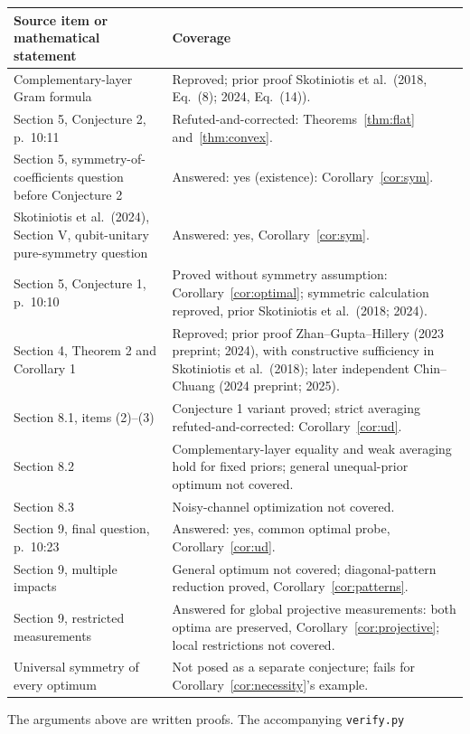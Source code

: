 \documentclass[11pt]{article}
\begin{document}
\begin{center}\small
\begin{tabular}{@{}p{.40\linewidth}p{.53\linewidth}@{}}
\toprule
Source item or mathematical statement&Coverage\\\midrule
Complementary-layer Gram formula&Reproved; prior proof Skotiniotis
et al.\ (2018, Eq.~(8); 2024, Eq.~(14)).\\
Section 5, Conjecture 2, p.~10:11&Refuted-and-corrected:
Theorems~\ref{thm:flat} and~\ref{thm:convex}.\\
Section 5, symmetry-of-coefficients question before Conjecture 2&Answered: yes
(existence):
Corollary~\ref{cor:sym}.\\
Skotiniotis et al.\ (2024), Section V, qubit-unitary pure-symmetry question&Answered:
yes, Corollary~\ref{cor:sym}.\\
Section 5, Conjecture 1, p.~10:10&Proved without symmetry assumption:
Corollary~\ref{cor:optimal}; symmetric calculation reproved, prior
Skotiniotis et al.\ (2018; 2024).\\
Section 4, Theorem 2 and Corollary 1&Reproved; prior proof
Zhan--Gupta--Hillery (2023 preprint; 2024), with constructive
sufficiency in Skotiniotis et al.\ (2018); later independent
Chin--Chuang (2024 preprint; 2025).\\
Section 8.1, items (2)--(3)&Conjecture 1 variant proved;
strict averaging refuted-and-corrected: Corollary~\ref{cor:ud}.\\
Section 8.2&Complementary-layer equality and weak averaging hold for
fixed priors; general unequal-prior optimum not covered.\\
Section 8.3&Noisy-channel optimization not covered.\\
Section 9, final question, p.~10:23&Answered: yes, common optimal probe,
Corollary~\ref{cor:ud}.\\
Section 9, multiple impacts&General optimum not covered;
diagonal-pattern reduction proved, Corollary~\ref{cor:patterns}.\\
Section 9, restricted measurements&Answered for global projective measurements:
both optima are preserved, Corollary~\ref{cor:projective}; local restrictions not covered.\\
Universal symmetry of every optimum&Not posed as a separate conjecture;
fails for Corollary~\ref{cor:necessity}'s example.\\\bottomrule
\end{tabular}
\end{center}
The arguments above are written proofs. The accompanying \texttt{verify.py}
\end{document}
